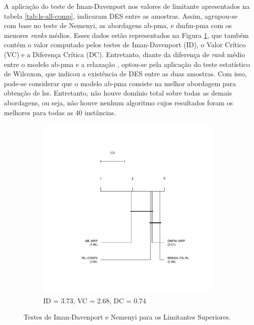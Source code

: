 A aplicação do teste de Iman-Davenport  nos valores de limitante apresentados na
tabela \ref{tab:ls-all-comp}, indicaram DES entre as amostras. Assim, agrupou-se
com  base   no  teste   de  Nemenyi,  as   abordagens  \gls{ab-pma},   {\rlq}  e
\gls{dmfm-pma}  com   os  menores   {\em  ranks}   médios.  Esses   dados  estão
representados  na Figura  \ref{fig:all-ls-nemenyi},  que também  contém o  valor
computado  pelos  testes de  Iman-Davenport  (ID),  o  Valor  Crítico (VC)  e  a
Diferença  Crítica (DC).  Entretanto, diante  da diferença  de {\em  rank} médio
entre o  modelo \gls{ab-pma} e  a relaxação  {\rlq}, optou-se pela  aplicação do
teste estatístico  de Wilcoxon, que  indicou a existência  de DES entre  as duas
amostras. Com  isso, pode-se  considerar que o  modelo \gls{ab-pma}  consiste na
melhor abordagem para obtenção de \gls{ls}s. Entretanto, não houve domínio total
sobre todas  as demais  abordagens, ou  seja, não  houve nenhum  algoritmo cujos
resultados foram os melhores para todas as 40 instâncias.

\begin{figure}[!ht] \centering
    \begin{subfigure}{.5\textwidth}
        \centering
        \includegraphics[scale=0.6]{imagens/ls_all.pdf}
        \vspace*{-2cm}
        \caption{ID = 3.73, VC = 2.68, DC = 0.74}
    \end{subfigure}
    \caption{Testes de Iman-Davenport e Nemenyi para os Limitantes Superiores.}
    \label{fig:all-ls-nemenyi}
\end{figure}

